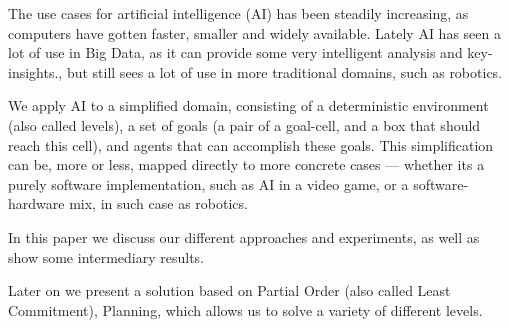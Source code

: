 \documentclass[Main]{subfiles}
\begin{document}
The use cases for artificial intelligence (AI) has been steadily increasing, as computers have gotten faster, smaller and widely available.
Lately AI has seen a lot of use in Big Data, as it can provide some very intelligent analysis and key-insights.\cite{OLeary2013},
but still sees a lot of use in more traditional domains, such as robotics.

We apply AI to a simplified domain, consisting of a deterministic environment (also called levels), a set of goals (a pair of a goal-cell, and a box that should reach this cell), and agents that can accomplish these goals.
This simplification can be, more or less, mapped directly to more concrete cases --- 
whether its a purely software implementation, such as AI in a video game, or a software-hardware mix, in such case as robotics.

In this paper we discuss our different approaches and experiments, as well as show some intermediary results.

Later on we present a solution based on Partial Order (also called Least Commitment), Planning, 
which allows us to solve a variety of different levels. 
\end{document}
